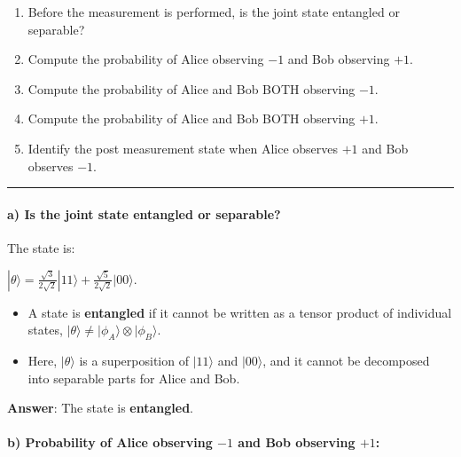 \documentclass[11pt]{article}
\providecommand{\tightlist}{%
      \setlength{\itemsep}{0pt}\setlength{\parskip}{0pt}}
\begin{document}
\begin{enumerate}
\def\labelenumi{\alph{enumi})}
\item
  Before the measurement is performed, is the joint state entangled or
  separable?
\item
  Compute the probability of Alice observing \(-1\) and Bob observing
  \(+1\).
\item
  Compute the probability of Alice and Bob BOTH observing \(−1\).
\item
  Compute the probability of Alice and Bob BOTH observing \(+1\).
\item
  Identify the post measurement state when Alice observes \(+1\) and Bob
  observes \(−1\).
\end{enumerate}

    \begin{center}\rule{0.5\linewidth}{0.5pt}\end{center}

\paragraph{\texorpdfstring{\textbf{a) Is the joint state entangled or
separable?}}{a) Is the joint state entangled or separable?}}\label{a-is-the-joint-state-entangled-or-separable}

The state is:

\(|\theta\rangle = \frac{\sqrt{3}}{2\sqrt{2}} |11\rangle + \frac{\sqrt{5}}{2\sqrt{2}} |00\rangle.\)

\begin{itemize}
\tightlist
\item
  A state is \textbf{entangled} if it cannot be written as a tensor
  product of individual states,
  \(|\theta\rangle \neq |\phi_A\rangle \otimes |\phi_B\rangle\).
\item
  Here, \(|\theta\rangle\) is a superposition of \(|11\rangle\) and
  \(|00\rangle\), and it cannot be decomposed into separable parts for
  Alice and Bob.
\end{itemize}

\textbf{Answer}: The state is \textbf{entangled}.

\paragraph{\texorpdfstring{\textbf{b) Probability of Alice observing
\(-1\) and Bob observing
\(+1\):}}{b) Probability of Alice observing -1 and Bob observing +1:}}\label{b-probability-of-alice-observing--1-and-bob-observing-1}
\end{document}

